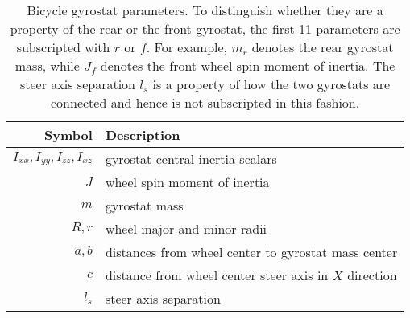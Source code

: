\begin{table}[h]
  \centering
  \begin{tabular}{rl}
    \toprule
    Symbol & Description \\
    \midrule
    $I_{xx}, I_{yy}, I_{zz}, I_{xz}$ & gyrostat central inertia scalars \\
    $J$ & wheel spin moment of inertia \\
    $m$ & gyrostat mass \\
    $R, r$ & wheel major and minor radii \\
    $a, b$ & distances from wheel center to gyrostat mass center \\
    $c$ & distance from wheel center steer axis in $X$ direction \\
    $l_s$ & steer axis separation \\
    \bottomrule
  \end{tabular}
  \caption{Bicycle gyrostat parameters. To distinguish whether they are a
    property of the rear or the front gyrostat, the first 11 parameters are
    subscripted with $r$ or $f$. For example, $m_r$ denotes the rear gyrostat
    mass, while $J_f$ denotes the front wheel spin moment of inertia. The steer
  axis separation $l_s$ is a property of how the two gyrostats are connected and
hence is not subscripted in this fashion.}
  \label{model:tab:parameters}
\end{table}
